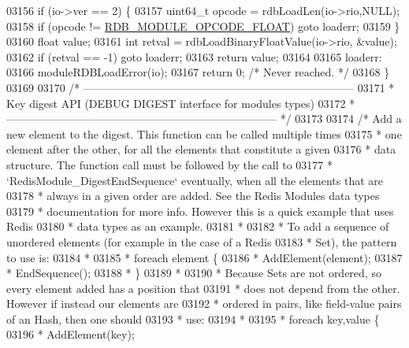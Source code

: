 \begin{DoxyCode}
{{{{{03156     \textcolor{keywordflow}{if} (io->ver == 2) \{
03157         uint64\_t opcode = rdbLoadLen(io->rio,NULL);
03158         \textcolor{keywordflow}{if} (opcode != \hyperlink{rdb_8h_ac6c932476609f11914ab1172688f247e}{RDB\_MODULE\_OPCODE\_FLOAT}) \textcolor{keywordflow}{goto} loaderr;
03159     \}
03160     \textcolor{keywordtype}{float} value;
03161     \textcolor{keywordtype}{int} retval = rdbLoadBinaryFloatValue(io->rio, &value);
03162     \textcolor{keywordflow}{if} (retval == -1) \textcolor{keywordflow}{goto} loaderr;
03163     \textcolor{keywordflow}{return} value;
03164 
03165 loaderr:
03166     moduleRDBLoadError(io);
03167     \textcolor{keywordflow}{return} 0; \textcolor{comment}{/* Never reached. */}
03168 \}
03169 
03170 \textcolor{comment}{/* --------------------------------------------------------------------------}
03171 \textcolor{comment}{ * Key digest API (DEBUG DIGEST interface for modules types)}
03172 \textcolor{comment}{ * -------------------------------------------------------------------------- */}
03173 
03174 \textcolor{comment}{/* Add a new element to the digest. This function can be called multiple times}
03175 \textcolor{comment}{ * one element after the other, for all the elements that constitute a given}
03176 \textcolor{comment}{ * data structure. The function call must be followed by the call to}
03177 \textcolor{comment}{ * `RedisModule\_DigestEndSequence` eventually, when all the elements that are}
03178 \textcolor{comment}{ * always in a given order are added. See the Redis Modules data types}
03179 \textcolor{comment}{ * documentation for more info. However this is a quick example that uses Redis}
03180 \textcolor{comment}{ * data types as an example.}
03181 \textcolor{comment}{ *}
03182 \textcolor{comment}{ * To add a sequence of unordered elements (for example in the case of a Redis}
03183 \textcolor{comment}{ * Set), the pattern to use is:}
03184 \textcolor{comment}{ *}
03185 \textcolor{comment}{ *     foreach element \{}
03186 \textcolor{comment}{ *         AddElement(element);}
03187 \textcolor{comment}{ *         EndSequence();}
03188 \textcolor{comment}{ *     \}}
03189 \textcolor{comment}{ *}
03190 \textcolor{comment}{ * Because Sets are not ordered, so every element added has a position that}
03191 \textcolor{comment}{ * does not depend from the other. However if instead our elements are}
03192 \textcolor{comment}{ * ordered in pairs, like field-value pairs of an Hash, then one should}
03193 \textcolor{comment}{ * use:}
03194 \textcolor{comment}{ *}
03195 \textcolor{comment}{ *     foreach key,value \{}
03196 \textcolor{comment}{ *         AddElement(key);}
}}}}}
\end{DoxyCode}
